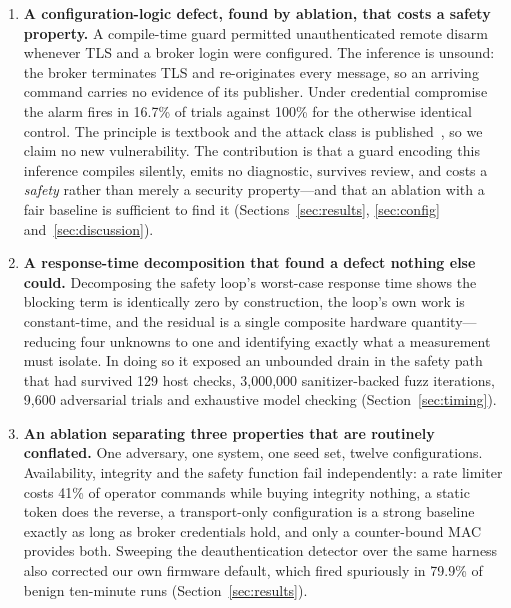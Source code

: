 \begin{enumerate}[leftmargin=1.4em,itemsep=0.25em]
\item \textbf{A configuration-logic defect, found by ablation, that costs a safety property.}
A compile-time guard permitted unauthenticated remote disarm whenever TLS and a broker login
were configured. The inference is unsound: the broker terminates TLS and re-originates every
message, so an arriving command carries no evidence of its publisher. Under credential
compromise the alarm fires in 16.7\% of trials against 100\% for the otherwise identical
control. The principle is textbook and the attack class is published~\cite{pirates2024}, so we
claim no new vulnerability. The contribution is that a guard encoding this inference compiles
silently, emits no diagnostic, survives review, and costs a \emph{safety} rather than merely a
security property---and that an ablation with a fair baseline is sufficient to find it
(Sections~\ref{sec:results}, \ref{sec:config} and~\ref{sec:discussion}).

\item \textbf{A response-time decomposition that found a defect nothing else could.}
Decomposing the safety loop's worst-case response time shows the blocking term is identically
zero by construction, the loop's own work is constant-time, and the residual is a single
composite hardware quantity---reducing four unknowns to one and identifying exactly what a
measurement must isolate. In doing so it exposed an unbounded drain in the safety path that had
survived 129 host checks, 3{,}000{,}000 sanitizer-backed fuzz iterations, 9{,}600 adversarial
trials and exhaustive model checking (Section~\ref{sec:timing}).

\item \textbf{An ablation separating three properties that are routinely conflated.} One
adversary, one system, one seed set, twelve configurations. Availability, integrity and the
safety function fail independently: a rate limiter costs 41\% of operator commands while buying
integrity nothing, a static token does the reverse, a transport-only configuration is a strong
baseline exactly as long as broker credentials hold, and only a counter-bound MAC provides
both. Sweeping the deauthentication detector over the same harness also corrected our own
firmware default, which fired spuriously in 79.9\% of benign ten-minute runs
(Section~\ref{sec:results}).


\end{enumerate}
